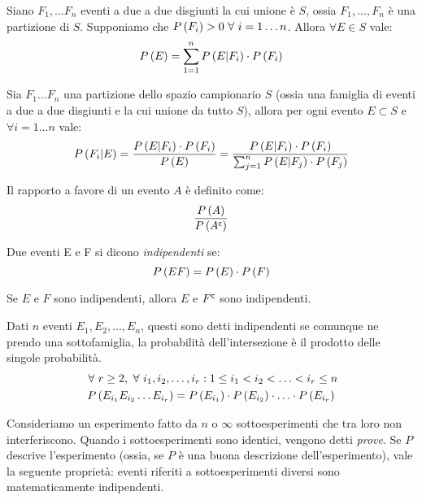 \begin{theorem}
Siano $F_1, \ldots F_n$ eventi a due a due disgiunti la cui unione \`e $S$, ossia $F_1, \dots, F_n$ \`e una partizione di $S$. Supponiamo che $\prob{F_i} > 0 \forall i = 1 \dots n$. Allora $\forall E \in S$ vale:
\[
P \left( {E} \right) = \sum_{1 = 1}^{n} P \left( E | F_i \right) \cdot P \left( {F_i} \right)
\]
\end{theorem}

\begin{theorem}
Sia $F_1 \dots F_n$ una partizione dello spazio campionario $S$ (ossia una famiglia di eventi a due a due disgiunti e la cui unione da tutto $S$), allora per ogni evento $E \subset S$ e $\forall i = 1 \dots n$ vale:
\[
P \left( F_i | E \right) = \frac{P \left( E | F_i \right) \cdot P \left( {F_i} \right)}{P \left( {E} \right)} = \frac{P \left( E | F_i \right) \cdot P \left( {F_i} \right)}{\sum_{j = 1}^{n} P \left( E | F_j \right) \cdot P \left( {F_j} \right)}
\]
\end{theorem}

\begin{defn}
Il rapporto a favore di un evento $A$ \`e definito come:
\[
\frac{P \left( {A} \right)}{P \left( {A^{\mathsf{c}}} \right)}
\]
\end{defn}

\begin{defn}
Due eventi E e F si dicono \emph{indipendenti} se:
\[
P \left( {E F} \right) = P \left( {E} \right) \cdot P \left( {F} \right)
\]
\end{defn}

\begin{prop}
Se $E$ e $F$ sono indipendenti, allora $E$ e $F^{\mathsf{c}}$ sono indipendenti.
\end{prop}

\begin{defn}
Dati $n$ eventi $E_1, E_2, \ldots, E_n$, questi sono detti indipendenti se comunque ne prendo una sottofamiglia, la probabilit\`a dell'intersezione \`e il prodotto delle singole probabilit\`a.
\begin{gather*}
\forall r \ge 2, \forall i_1, i_2, \ldots, i_r : 1 \le i_1 < i_2 < \ldots < i_r \le n \\ 
\prob{E_{i_1} E_{i_2} \ldots E_{i_r}} = \prob{E_{i_1}} \cdot \prob{E_{i_2}} \cdot \ldots \cdot \prob{E_{i_r}}
\end{gather*}
\end{defn}
Consideriamo un esperimento fatto da $n$ o $\infty$ sottoesperimenti che tra loro non interferiscono. Quando i sottoesperimenti sono identici, vengono detti \emph{prove}. Se $P$ descrive l'esperimento (ossia, se $P$ \`e una buona descrizione dell'esperimento), vale la seguente propriet\`a: eventi riferiti a sottoesperimenti diversi sono matematicamente indipendenti.

